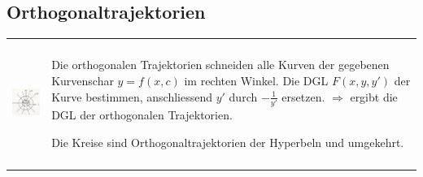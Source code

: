 %     
%      
%     
\subsection{Orthogonaltrajektorien}
\begin{tabular}{ll}
\parbox{4.5cm}{
\includegraphics[height=4cm]{./bilder/orthoTrajekt.png}
}
& \parbox{14.5cm}{
Die orthogonalen Trajektorien schneiden alle Kurven der gegebenen Kurvenschar
$y=f(x,c)$ im rechten Winkel.\\
Die DGL $F(x,y,y')$ der Kurve bestimmen, anschliessend $y'$ durch
$-\frac{1}{y'}$ ersetzen.\\
$\Rightarrow$ ergibt die DGL der orthogonalen Trajektorien.\\
 \\
Die Kreise sind Orthogonaltrajektorien der Hyperbeln und umgekehrt.
}
\end{tabular}
